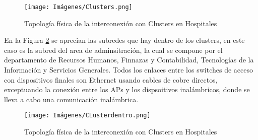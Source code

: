 \begin{figure}[H]
    \centering
    \texttt{[image: Imágenes/Clusters.png]}
    \caption{Topología física de la interconexión con Clusters en Hospitales}
    \label{fig:CLustersHospitales}
\end{figure}

En la Figura \ref{fig:CLustersDentroHospitales} se aprecian las subredes que hay dentro de los clusters, en este caso es la subred del area de adminsitración, la cual se compone por el departamento de Recursos Humanos, Finnazas y Contabilidad, Tecnologías de la Información y Servicios Generales. Todos los enlaces 
entre los switches de acceso con dispositivos finales son Ethernet usando cables de cobre directos, exceptuando la conexión entre los APs y los dispsoitivos inalámbricos, donde se lleva a cabo una comunicación inalámbrica.
\begin{figure}[H]
    \centering
    \texttt{[image: Imágenes/CLusterdentro.png]}
    \caption{Topología física de la interconexión con Clusters en Hospitales}
    \label{fig:CLustersDentroHospitales}
\end{figure}



